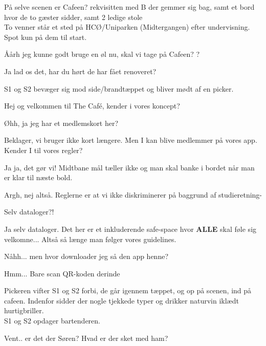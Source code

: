 \documentclass[a4paper,11pt]{article}
\begin{document}
\begin{sketch}

\scene På selve scenen er Cafeen? rekvisitten med B der gemmer sig bag, samt et bord hvor de to gæster sidder, samt 2 ledige stole\\
To venner står et sted på HCØ/Uniparken (Midtergangen) efter undervisning. Spot kun på dem til start.

 Åårh jeg kunne godt bruge en øl nu, skal vi tage på Cafeen? ?

 Ja lad os det, har du hørt de har fået renoveret?

\scene S1 og S2 bevæger sig mod side/brandtæppet og bliver mødt af en picker.

 Hej og velkommen til The Café, kender i vores koncept?

 Øhh, ja jeg har et medlemskort her?

 Beklager, vi bruger ikke kort længere. Men I kan blive medlemmer på vores app. Kender I til vores regler? 

 Ja ja, det gør vi! Midtbane mål tæller ikke og man skal banke i bordet når man er klar til næste bold.

  Argh, nej altså. Reglerne er at vi ikke diskriminerer på baggrund af studieretning-

 Selv dataloger?! 

 Ja selv dataloger. Det her er et inkluderende safe-space hvor \textbf{ALLE} skal føle sig velkomne... Altså så længe man følger vores guidelines. 



 Nåhh... men hvor downloader jeg så den app henne? 

 Hmm...  
  Bare scan QR-koden derinde

\scene Pickeren vifter S1 og S2 forbi, de går igennem tæppet, og op på scenen, ind på cafeen.
Indenfor sidder der nogle tjekkede typer og drikker naturvin iklædt hurtigbriller. \\
S1 og S2 opdager bartenderen. 

 Vent.. er det der Søren? Hvad er der sket med ham? 


\end{sketch}
\end{document}
